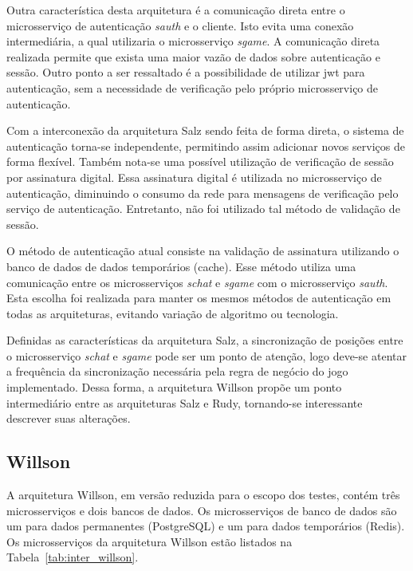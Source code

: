 Outra característica desta arquitetura é a comunicação direta entre o microsserviço de autenticação \textit{sauth} e o cliente.
%
Isto evita uma conexão intermediária, a qual utilizaria o microsserviço \textit{sgame}.
%
A comunicação direta realizada permite que exista uma maior vazão de dados sobre autenticação e sessão.
%
Outro ponto a ser ressaltado é a possibilidade de utilizar \ac{jwt} para autenticação, sem a necessidade de verificação pelo próprio microsserviço de autenticação.



Com a interconexão da arquitetura Salz sendo feita de forma direta, o sistema de autenticação torna-se independente, permitindo assim adicionar novos serviços de forma flexível.
%
Também nota-se uma possível utilização de verificação de sessão por assinatura digital.
%
Essa assinatura digital é utilizada no microsserviço de autenticação, diminuindo o consumo da rede para mensagens de verificação pelo serviço de autenticação.
%
Entretanto, não foi utilizado tal método de validação de sessão.




O método de autenticação atual consiste na validação de assinatura utilizando o banco de dados de dados temporários (cache).
%
Esse método utiliza uma comunicação entre os microsserviços \textit{schat} e \textit{sgame} com o microsserviço \textit{sauth}.
%
Esta escolha foi realizada para manter os mesmos métodos de autenticação em todas as arquiteturas, evitando variação de algoritmo ou tecnologia.



Definidas as características da arquitetura Salz, a sincronização de posições entre o microsserviço \textit{schat} e \textit{sgame} pode ser um ponto de atenção, logo deve-se atentar a frequência da sincronização necessária pela regra de negócio do jogo implementado.
%
Dessa forma, a arquitetura Willson propõe um ponto intermediário entre as arquiteturas Salz e Rudy, tornando-se interessante descrever suas alterações.



\subsection{Willson}
\label{sec:inter_willson}


A arquitetura Willson, em versão reduzida para o escopo dos testes, contém três microsserviços e dois bancos de dados.
%
Os microsserviços de banco de dados são um para dados permanentes (PostgreSQL) e um para dados temporários (Redis).
%
Os microsserviços da arquitetura Willson estão listados na Tabela~\ref{tab:inter_willson}.



